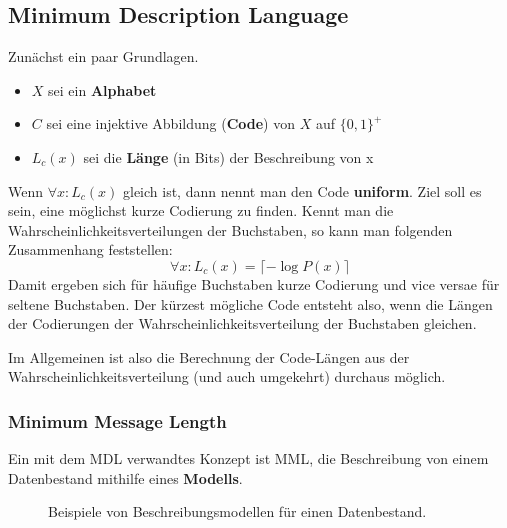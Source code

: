 \subsection{Minimum Description Language}
Zunächst ein paar Grundlagen.

\begin{itemize}
	\item \(X\) sei ein \textbf{Alphabet}
	\item \(C\) sei eine injektive Abbildung (\textbf{Code}) von \(X\) auf
		\(\{0,1\}^{+}\)
	\item \(L_c (x)\) sei die \textbf{Länge} (in Bits) der Beschreibung von x
\end{itemize}

Wenn \(\forall x: L_c(x)\) gleich ist, dann nennt man den Code \textbf{uniform}. Ziel soll
es sein, eine möglichst kurze Codierung zu finden. Kennt man die 
Wahrscheinlichkeitsverteilungen der Buchstaben, so kann man folgenden Zusammenhang
feststellen:
\[
	\forall x: L_c(x) = \lceil -\log P(x) \rceil
\]
Damit ergeben sich für häufige Buchstaben kurze Codierung und vice versae für seltene
Buchstaben. Der kürzest mögliche Code entsteht also, wenn die Längen der Codierungen
der Wahrscheinlichkeitsverteilung der Buchstaben gleichen.

Im Allgemeinen ist also die Berechnung der Code-Längen aus der Wahrscheinlichkeitsverteilung
(und auch umgekehrt) durchaus möglich.

\subsubsection{Minimum Message Length}
Ein mit dem MDL verwandtes Konzept ist MML, die Beschreibung von einem Datenbestand
mithilfe eines \textbf{Modells}. 

\begin{figure}
	\caption[MML]{Beispiele von Beschreibungsmodellen für einen Datenbestand.\footnotemark}
	\label{fig:mml}
\end{figure}

